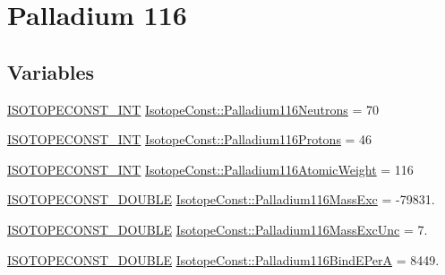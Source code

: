 \hypertarget{group___isotope_const-_palladium-_pd116}{}\section{Palladium 116}
\label{group___isotope_const-_palladium-_pd116}
\subsection*{Variables}
\begin{DoxyCompactItemize}
\item 
\mbox{\hyperlink{group___isotope_const-_macros_ga5f18360b3e99483a35c32d789e62621c}{I\+S\+O\+T\+O\+P\+E\+C\+O\+N\+S\+T\+\_\+\+I\+NT}} \mbox{\hyperlink{group___isotope_const-_palladium-_pd116_ga8946072366c111a6b76eb501748a1e37}{Isotope\+Const\+::\+Palladium116\+Neutrons}} = 70
\item 
\mbox{\hyperlink{group___isotope_const-_macros_ga5f18360b3e99483a35c32d789e62621c}{I\+S\+O\+T\+O\+P\+E\+C\+O\+N\+S\+T\+\_\+\+I\+NT}} \mbox{\hyperlink{group___isotope_const-_palladium-_pd116_ga20d58ef92226ae6c66898b9cda7f07da}{Isotope\+Const\+::\+Palladium116\+Protons}} = 46
\item 
\mbox{\hyperlink{group___isotope_const-_macros_ga5f18360b3e99483a35c32d789e62621c}{I\+S\+O\+T\+O\+P\+E\+C\+O\+N\+S\+T\+\_\+\+I\+NT}} \mbox{\hyperlink{group___isotope_const-_palladium-_pd116_ga921bcffd163cfb1a2b2d2188d86da82e}{Isotope\+Const\+::\+Palladium116\+Atomic\+Weight}} = 116
\item 
\mbox{\hyperlink{group___isotope_const-_macros_ga8f45a7272ce02c0b4c65c44636ed719a}{I\+S\+O\+T\+O\+P\+E\+C\+O\+N\+S\+T\+\_\+\+D\+O\+U\+B\+LE}} \mbox{\hyperlink{group___isotope_const-_palladium-_pd116_ga8964c06b8b9eaf1f2df69fd48bae2704}{Isotope\+Const\+::\+Palladium116\+Mass\+Exc}} = -\/79831.
\item 
\mbox{\hyperlink{group___isotope_const-_macros_ga8f45a7272ce02c0b4c65c44636ed719a}{I\+S\+O\+T\+O\+P\+E\+C\+O\+N\+S\+T\+\_\+\+D\+O\+U\+B\+LE}} \mbox{\hyperlink{group___isotope_const-_palladium-_pd116_ga38982b6b2e39bad5017a6817bb9aec9b}{Isotope\+Const\+::\+Palladium116\+Mass\+Exc\+Unc}} = 7.
\item 
\mbox{\hyperlink{group___isotope_const-_macros_ga8f45a7272ce02c0b4c65c44636ed719a}{I\+S\+O\+T\+O\+P\+E\+C\+O\+N\+S\+T\+\_\+\+D\+O\+U\+B\+LE}} \mbox{\hyperlink{group___isotope_const-_palladium-_pd116_gab0e5fee322e92cbc28f5ef128abcea39}{Isotope\+Const\+::\+Palladium116\+Bind\+E\+PerA}} = 8449.
\item 

\end{DoxyCompactItemize}
